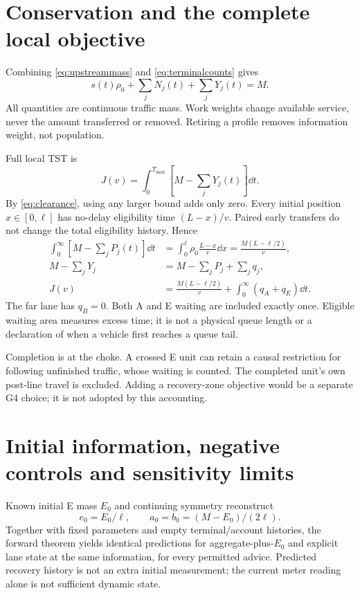 \section{Conservation and the complete local objective}
\label{sec:accounting}
Combining \eqref{eq:upstreammass} and \eqref{eq:terminalcounts} gives
\begin{equation}
 s(t)\rho_0+\sum_jN_j(t)+\sum_jY_j(t)=M. \label{eq:mass}
\end{equation}
All quantities are continuous traffic mass. Work weights change available
service, never the amount transferred or removed. Retiring a profile
removes information weight, not population.

Full local TST is
\begin{equation}
 J(v)=\int_0^{T_{\max}}\left[M-\sum_jY_j(t)\right]\dd t.
 \label{eq:tst}
\end{equation}
By \eqref{eq:clearance}, using any larger bound adds only zero. Every
initial position $x\in[0,\ell]$ has no-delay eligibility time $(L-x)/v$.
Paired early transfers do not change the total eligibility history. Hence
\begin{align}
 \int_0^\infty\left[M-\sum_jP_j(t)\right]\dd t
 &=\int_0^\ell\rho_0\frac{L-x}{v}\dd x
 =\frac{M(L-\ell/2)}v,\nonumber\\
 M-\sum_jY_j&=M-\sum_jP_j+\sum_jq_j,\nonumber\\
 J(v)&=\frac{M(L-\ell/2)}v+\int_0^\infty(q_A+q_E)\dd t.
 \label{eq:tstqueue}
\end{align}
The far lane has $q_B=0$. Both A and E waiting are included exactly once.
Eligible waiting area measures excess time; it is not a physical queue
length or a declaration of when a vehicle first reaches a queue tail.

Completion is at the choke. A crossed E unit can retain a causal restriction
for following unfinished traffic, whose waiting is counted. The completed
unit's own post-line travel is excluded. Adding a recovery-zone objective
would be a separate G4 choice; it is not adopted by this accounting.

\section{Initial information, negative controls and sensitivity limits}
\label{sec:information}
Known initial E mass $E_0$ and continuing symmetry reconstruct
\begin{equation}
 e_0=E_0/\ell,\qquad a_0=b_0=(M-E_0)/(2\ell). \label{eq:scalar}
\end{equation}
Together with fixed parameters and empty terminal/account histories,
the forward theorem yields identical predictions for aggregate-plus-$E_0$
and explicit lane state at the same information, for every permitted
advice. Predicted recovery history is not an extra initial measurement;
the current meter reading alone is not sufficient dynamic state.

